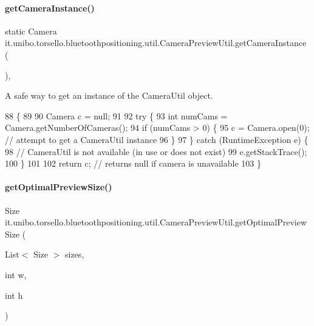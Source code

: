\paragraph{\texorpdfstring{get\+Camera\+Instance()}{getCameraInstance()}}
{\footnotesize\ttfamily static Camera it.\+unibo.\+torsello.\+bluetoothpositioning.\+util.\+Camera\+Preview\+Util.\+get\+Camera\+Instance (\begin{DoxyParamCaption}{ }\end{DoxyParamCaption})\hspace{0.3cm}{\ttfamily [static]}, {\ttfamily [private]}}

A safe way to get an instance of the Camera\+Util object. 
\begin{DoxyCode}
88                                               \{
89 
90         Camera c = null;
91 
92         \textcolor{keywordflow}{try} \{
93             \textcolor{keywordtype}{int} numCams = Camera.getNumberOfCameras();
94             \textcolor{keywordflow}{if} (numCams > 0) \{
95                 c = Camera.open(0); \textcolor{comment}{// attempt to get a CameraUtil instance}
96             \}
97         \} \textcolor{keywordflow}{catch} (RuntimeException e) \{
98             \textcolor{comment}{// CameraUtil is not available (in use or does not exist)}
99             e.getStackTrace();
100         \}
101 
102         \textcolor{keywordflow}{return} c; \textcolor{comment}{// returns null if camera is unavailable}
103     \}
\end{DoxyCode}
\hypertarget{classit_1_1unibo_1_1torsello_1_1bluetoothpositioning_1_1util_1_1CameraPreviewUtil_ac7a729182a7e912d771f587f89a2ce03_ac7a729182a7e912d771f587f89a2ce03}{}\label{classit_1_1unibo_1_1torsello_1_1bluetoothpositioning_1_1util_1_1CameraPreviewUtil_ac7a729182a7e912d771f587f89a2ce03_ac7a729182a7e912d771f587f89a2ce03} 
\paragraph{\texorpdfstring{get\+Optimal\+Preview\+Size()}{getOptimalPreviewSize()}}
{\footnotesize\ttfamily Size it.\+unibo.\+torsello.\+bluetoothpositioning.\+util.\+Camera\+Preview\+Util.\+get\+Optimal\+Preview\+Size (\begin{DoxyParamCaption}\item[{List$<$ Size $>$}]{sizes,  }\item[{int}]{w,  }\item[{int}]{h }\end{DoxyParamCaption})\hspace{0.3cm}{\ttfamily [private]}}


